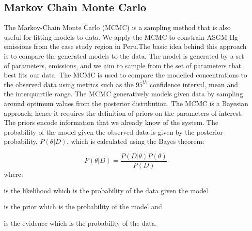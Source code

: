 \subsection{Markov Chain Monte Carlo}

\begin{flushleft}
The Markov-Chain Monte Carlo (MCMC) is a sampling method that is also useful for fitting models to data\cite{hogg_data_2018}. We apply the MCMC to constrain ASGM Hg emissions from the case study region in Peru.The basic idea behind this approach is to compare the generated models to the data. The model is generated by a set of parameters, emissions, and we aim to sample from the set of parameters that best fits our data. The MCMC is used to compare the modelled concentrations to the observed data using metrics such as the $95^{th}$ confidence interval, mean and the interquartile range. The MCMC generatively models given data by sampling around optimum values from the posterior distribution. The MCMC is a Bayesian approach; hence it requires the definition of priors on the parameters of interest. The priors encode information that we already know of the system. The probability of the model given the observed data is given by the posterior probability, $P(\theta|D)$, which is calculated using the Bayes theorem:

\begin{equation}
\label{bayes_eq}
P(\theta|D)=\frac{P(D|\theta)P(\theta)}{P(D)}
\end{equation}
where:
\end{flushleft}

\begin{description}[leftmargin=!,labelwidth={3 em}]
    \item [$P(D|\theta)$] is the likelihood which is the probability of the data given the model
    \item [$P(\theta)$] is the prior which is the probability of the model and 
    \item [$P(D)$] is the evidence which is the probability of the data.
\end{description}

